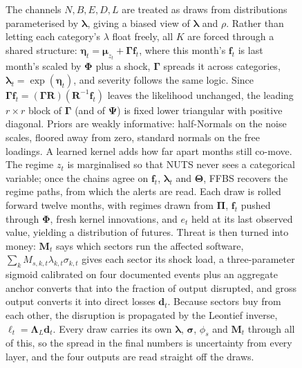 \documentclass[review]{elsarticle}
\begin{document}
\begin{figure}[p]
{%
}
\caption{The channels $N, B, E, D, L$ are treated as draws from distributions parameterised by $\bm{\lambda}$, giving a biased view of $\bm{\lambda}$ and $\rho$. Rather than letting each category's $\lambda$ float freely, all $K$ are forced through a shared structure: $\bm{\eta}_t = \bm{\mu}_{z_t} + \bm{\Gamma}\bm{f}_t$, where this month's $\bm{f}_t$ is last month's scaled by $\bm{\Phi}$ plus a shock, $\bm{\Gamma}$ spreads it across categories, $\bm{\lambda}_t = \exp(\bm{\eta}_t)$, and severity follows the same logic. Since $\bm{\Gamma}\bm{f}_t = (\bm{\Gamma}\bm{R})(\bm{R}^{-1}\bm{f}_t)$ leaves the likelihood unchanged, the leading $r \times r$ block of $\bm{\Gamma}$ (and of $\bm{\Psi}$) is fixed lower triangular with positive diagonal. Priors are weakly informative: half-Normals on the noise scales, floored away from zero, standard normals on the free loadings. A learned kernel adds how far apart months still co-move. The regime $z_t$ is marginalised so that NUTS never sees a categorical variable; once the chains agree on $\bm{f}_t$, $\bm{\lambda}_t$ and $\bm{\Theta}$, FFBS recovers the regime paths, from which the alerts are read. Each draw is rolled forward twelve months, with regimes drawn from $\bm{\Pi}$, $\bm{f}_t$ pushed through $\bm{\Phi}$, fresh kernel innovations, and $e_t$ held at its last observed value, yielding a distribution of futures. Threat is then turned into money: $\bm{M}_t$ says which sectors run the affected software, $\sum_k M_{s,k,t}\lambda_{k,t}\sigma_{k,t}$ gives each sector its shock load, a three-parameter sigmoid calibrated on four documented events plus an aggregate anchor converts that into the fraction of output disrupted, and gross output converts it into direct losses $\bm{d}_t$. Because sectors buy from each other, the disruption is propagated by the Leontief inverse, $\bm{\ell}_t = \bm{\Lambda}_L \bm{d}_t$. Every draw carries its own $\bm{\lambda}$, $\bm{\sigma}$, $\phi_s$ and $\bm{M}_t$ through all of this, so the spread in the final numbers is uncertainty from every layer, and the four outputs are read straight off the draws.}
\label{fig:pipeline}
\end{figure}
\endgroup
\end{document}
